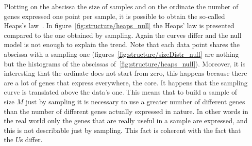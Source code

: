 Plotting on the abscissa the size of samples and on the ordinate the number of genes expressed one point per sample, it is possible to obtain the so-called Heaps's law~\cite{Heaps:1978:IRC:539986}. In figure~\ref{fig:structure/heaps_null} the Heaps' law is presented compared to the one obtained by sampling. Again the curves differ and the null model is not enough to explain the trend. Note that each data point shares the abscissa with a sampling one (figures~\ref{fig:structure/sizeDistr_null} are nothing but the histograms of the abscissas of~\ref{fig:structure/heaps_null}). Moreover, it is interesting that the ordinate does not start from zero, this happens because there are a lot of genes that express everywhere, the core. It happens that the sampling curve is translated above the data's one. This means that to build a sample of size $M$ just by sampling it is necessary to use a greater number of different genes than the number of different genes actually expressed in nature. In other words in the real world only the genes that are really useful in a sample are expressed, and this is not describable just by sampling. This fact is coherent with the fact that the $U$s differ.
